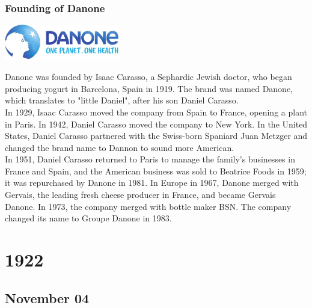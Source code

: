 \documentclass[11pt]{report}
\begin{document}
\subsection{Founding of Danone}
\vspace{2mm}\begin{center}\includegraphics[width=5cm]{./img/danoneLogo.jpg}\end{center}
Danone was founded by Isaac Carasso, a Sephardic Jewish doctor, who began producing yogurt in Barcelona, Spain in 1919. The brand was named Danone, which translates to "little Daniel", after his son Daniel Carasso.\\
\indent In 1929, Isaac Carasso moved the company from Spain to France, opening a plant in Paris. In 1942, Daniel Carasso moved the company to New York. In the United States, Daniel Carasso partnered with the Swiss-born Spaniard Juan Metzger and changed the brand name to Dannon to sound more American.\\ \indent In 1951, Daniel Carasso returned to Paris to manage the family's businesses in France and Spain, and the American business was sold to Beatrice Foods in 1959; it was repurchased by Danone in 1981. In Europe in 1967, Danone merged with Gervais, the leading fresh cheese producer in France, and became Gervais Danone. In 1973, the company merged with bottle maker BSN. The company changed its name to Groupe Danone in 1983.

\chapter{1922}
\section{November 04}
\end{document}
